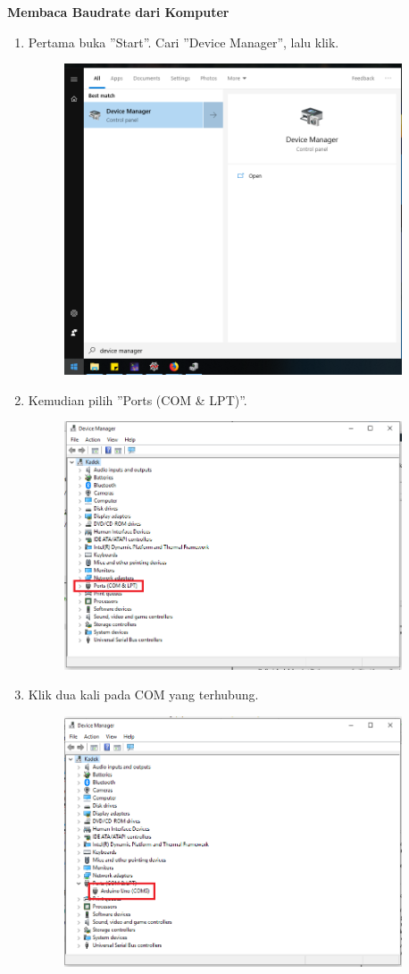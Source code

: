 \hfill \break
\textbf{Membaca Baudrate dari Komputer}
\begin{enumerate}
	\item Pertama buka ''Start''. Cari ''Device Manager'', lalu klik.
	\begin{figure}[H]
		\includegraphics[width=10cm]{figures/5/1174086/Teori/d1.png}
		\centering
	\end{figure}
	
	\item Kemudian pilih ''Ports (COM \& LPT)''.
	\begin{figure}[H]
		\includegraphics[width=10cm]{figures/5/1174086/Teori/d3.png}
		\centering
	\end{figure}
	
	\item Klik dua kali pada COM yang terhubung.
	\begin{figure}[H]
		\includegraphics[width=10cm]{figures/5/1174086/Teori/d2.png}
		\centering
	\end{figure}


\end{enumerate}
